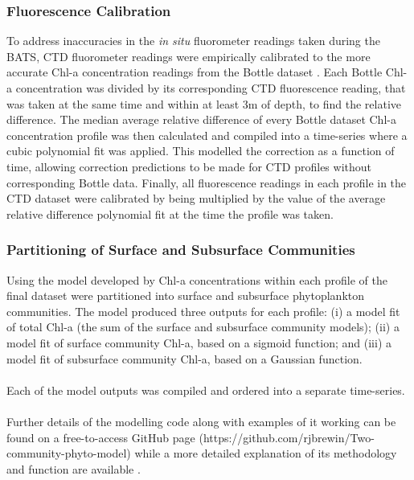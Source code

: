 \documentclass{article}
\begin{document}
\subsubsection{Fluorescence Calibration}
To address inaccuracies in the \textit{in situ} fluorometer readings taken during the BATS, CTD fluorometer readings were empirically calibrated to the more accurate Chl-a concentration readings from the Bottle dataset \citep{wolfe_experimental_2006}. Each Bottle Chl-a concentration was divided by its corresponding CTD fluorescence reading, that was taken at the same time and within at least 3m of depth, to find the relative difference. The median average relative difference of every Bottle dataset Chl-a concentration profile was then calculated and compiled into a time-series where a cubic polynomial fit was applied. This modelled the correction as a function of time, allowing correction predictions to be made for CTD profiles without corresponding Bottle data. Finally, all fluorescence readings in each profile in the CTD dataset were calibrated by being multiplied by the value of the average relative difference polynomial fit at the  time the profile was taken.
\subsubsection{Partitioning of Surface and Subsurface Communities}
Using the model developed by \cite{brewin_conceptual_2022} Chl-a concentrations within each profile of the final dataset were partitioned into surface and subsurface phytoplankton communities. The model produced three outputs for each profile: (i) a model fit of total Chl-a (the sum of the surface and subsurface community models); (ii) a model fit of surface community Chl-a, based on a sigmoid function; and (iii) a model fit of subsurface community Chl-a, based on a Gaussian function. \\ \\
\noindent
Each of the model outputs was compiled and ordered into a separate time-series.\\ \\
\noindent
Further details of the modelling code along with examples of it working can be found on a free-to-access GitHub page (https://github.com/rjbrewin/Two-community-phyto-model) while a more detailed explanation of its methodology and function are available \citep{brewin_conceptual_2022}. 
\end{document}
